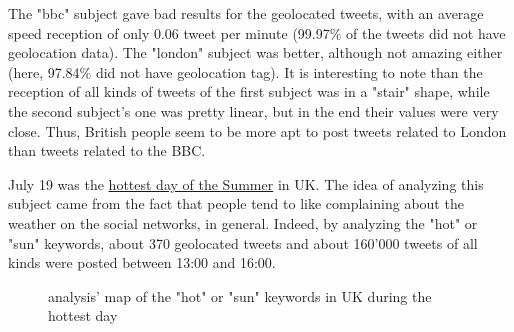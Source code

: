 \documentclass[a4paper,11pt]{report}
\begin{document}
The "bbc" subject gave bad results for the geolocated tweets, with an average speed reception of only 0.06 tweet per minute (99.97\% of the tweets did not have geolocation data). The "london" subject was better, although not amazing either (here, 97.84\% did not have geolocation tag). It is interesting to note than the reception of all kinds of tweets of the first subject was in a "stair" shape, while the second subject's one was pretty linear, but in the end their values were very close. Thus, British people seem to be more apt to post tweets related to London than tweets related to the BBC.
\bigskip
\newpage

July 19 was the \underline{hottest day of the Summer} in UK. The idea of analyzing this subject came from the fact that people tend to like complaining about the weather on the social networks, in general. Indeed, by analyzing the "hot" or "sun" keywords, about 370 geolocated tweets and about 160'000 tweets of all kinds were posted between 13:00 and 16:00.
\begin{figure}[H]
\vspace{-5pt}
\begin{center}
\vspace{-5pt}
\caption{analysis' map of the "hot" or "sun" keywords in UK during the hottest day}
\end{center}
\end{figure}
\vspace{-10pt}
\end{document}
